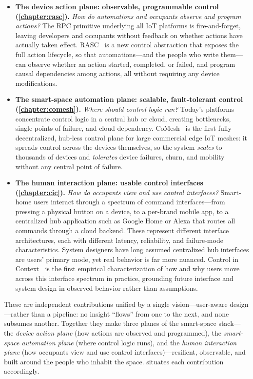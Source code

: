 \begin{itemize}
    \item \textbf{The device action plane: observable, programmable control (\ref{chapter:rasc}).}
    \emph{How do automations and occupants observe and program actions?}
    The RPC primitive underlying all IoT platforms is fire-and-forget, leaving developers and occupants without feedback on whether actions have actually taken effect. RASC~\cite{rasc} is a new control abstraction that exposes the full action lifecycle, so that automations---and the people who write them---can observe whether an action started, completed, or failed, and program causal dependencies among actions, all without requiring any device modifications.

    \item \textbf{The smart-space automation plane: scalable, fault-tolerant control (\ref{chapter:comesh}).}
    \emph{Where should control logic run?}
    Today's platforms concentrate control logic in a central hub or cloud, creating bottlenecks, single points of failure, and cloud dependency. CoMesh~\cite{comesh} is the first fully decentralized, hub-less control plane for large commercial edge IoT meshes: it spreads control across the devices themselves, so the system \emph{scales} to thousands of devices and \emph{tolerates} device failures, churn, and mobility without any central point of failure.

    \item \textbf{The human interaction plane: usable control interfaces (\ref{chapter:cic}).}
    \emph{How do occupants view and use control interfaces?}
    Smart-home users interact through a spectrum of command interfaces---from pressing a physical button on a device, to a per-brand mobile app, to a centralized hub application such as Google Home or Alexa that routes all commands through a cloud backend.
    These represent different interface architectures, each with different latency, reliability, and failure-mode characteristics.
    System designers have long assumed centralized hub interfaces are users' primary mode, yet real behavior is far more nuanced.
    Control in Context~\cite{controlincontext} is the first empirical characterization of how and why users move across this interface spectrum in practice, grounding future interface and system design in observed behavior rather than assumptions.
\end{itemize}

These are independent contributions unified by a single vision---user-aware design---rather than a pipeline: no insight ``flows'' from one to the next, and none subsumes another. Together they make three planes of the smart-space stack---the \emph{device action plane} (how actions are observed and programmed), the \emph{smart-space automation plane} (where control logic runs), and the \emph{human interaction plane} (how occupants view and use control interfaces)---resilient, observable, and built around the people who inhabit the space.  situates each contribution accordingly.


